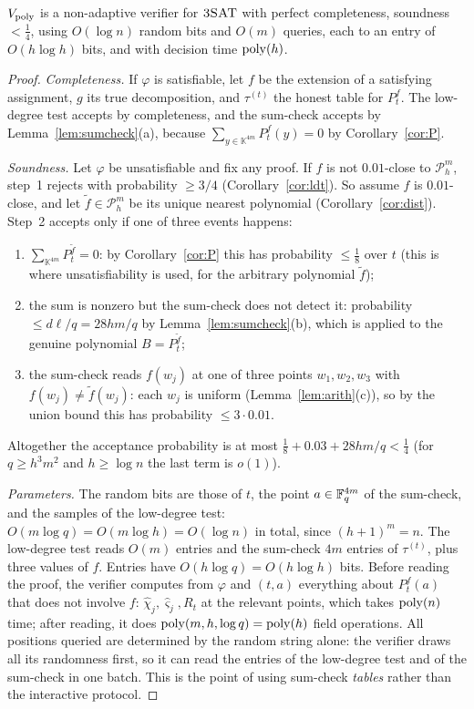 \begin{theorem}\label{thm:vpoly}
$V_{\rm poly}$ is a non-adaptive verifier for $\textsc{3SAT}$ with perfect completeness, soundness $<\tfrac14$, using $O(\log n)$ random bits and $O(m)$ queries,
each to an entry of $O(h\log h)$ bits, and with decision time $\operatorname{poly}(h)$.
\end{theorem}
\begin{proof}
\emph{Completeness.}  If $\varphi$ is satisfiable, let $f$ be the extension of a satisfying assignment, $g$ its true decomposition, and $\tau^{(t)}$ the honest table for $P_t^f$.  The low-degree test accepts by completeness, and
the sum-check accepts by Lemma~\ref{lem:sumcheck}(a), because $\sum_{y\in\mathbb K^{4m}}P^f_t(y)=0$ by Corollary~\ref{cor:P}.

\emph{Soundness.}  Let $\varphi$ be unsatisfiable and fix any proof.  If $f$ is not $0.01$-close to $\mathcal P^m_h$, step~1 rejects with probability $\ge3/4$ (Corollary~\ref{cor:ldt}).
So assume $f$ is $0.01$-close, and let $\tilde f\in\mathcal P^m_h$ be its unique nearest polynomial (Corollary~\ref{cor:dist}).  Step~2 accepts only if one of three events happens:
\begin{enumerate}[label=(\roman*)]
  \item $\sum_{\mathbb K^{4m}}P^{\tilde f}_t=0$: by Corollary~\ref{cor:P} this has probability $\le\tfrac18$ over $t$ (this is where unsatisfiability is used, for the arbitrary polynomial $\tilde f$);
  \item the sum is nonzero but the sum-check does not detect it: probability $\le d\ell/q=28hm/q$ by Lemma~\ref{lem:sumcheck}(b), which is applied to the genuine polynomial $B=P_t^{\tilde f}$;
  \item the sum-check reads $f(w_j)$ at one of three points $w_1,w_2,w_3$ with $f(w_j)\ne\tilde f(w_j)$: each $w_j$ is uniform (Lemma~\ref{lem:arith}(c)), so by the union bound this has probability $\le3\cdot0.01$.
\end{enumerate}
Altogether the acceptance probability is at most $\tfrac18+0.03+28hm/q<\tfrac14$ (for $q\ge h^3m^2$ and $h\ge\log n$ the last term is $o(1)$).

\emph{Parameters.}  The random bits are those of $t$, the point $a\in\mathbb{F}_q^{4m}$ of the sum-check, and the samples of the low-degree test: $O(m\log q)=O(m\log h)=O(\log n)$ in total, since $(h+1)^{m}=n$.
The low-degree test reads $O(m)$ entries and the sum-check $4m$ entries of $\tau^{(t)}$, plus three values of $f$.  Entries have $O(h\log q)=O(h\log h)$ bits.  Before reading the proof, the verifier computes from $\varphi$ and $(t,a)$ everything about
$P^f_t(a)$ that does not involve $f$: $\hat\chi_j,\hat\varsigma_j,R_t$ at the relevant points, which takes $\operatorname{poly}(n)$ time; after reading, it does $\operatorname{poly}(m,h,\log q)=\operatorname{poly}(h)$ field operations.  All positions queried are determined by the random string alone: the verifier draws all its randomness first, so it can read the entries of the
low-degree test and of the sum-check in one batch.  This is the point of using sum-check \emph{tables} rather than the interactive protocol.
\end{proof}

